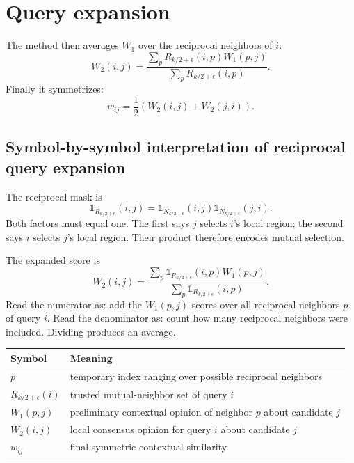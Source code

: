 \documentclass[11pt,oneside,openany]{book}
\theoremstyle{myplain}
\theoremstyle{definition}
\newcommand{\ind}{\mathds{1}}
\newcommand{\paperEq}[1]{\tag{P#1}}
\begin{document}
\section{Query expansion}

The method then averages $W_1$ over the reciprocal neighbors of $i$:
\begin{equation}
  W_2(i,j)=
  \frac{\sum_p R_{k/2+\epsilon}(i,p)W_1(p,j)}
       {\sum_p R_{k/2+\epsilon}(i,p)}.
  \label{eq:w2}
\end{equation}
Finally it symmetrizes:
\begin{equation*}
  \boxed{w_{ij}=\frac12\left(W_2(i,j)+W_2(j,i)\right).}
\paperEq{4}
\label{eq:qe}
\end{equation*}

\subsection{Symbol-by-symbol interpretation of reciprocal query expansion}

The reciprocal mask is
\[
\ind_{R_{k/2+\epsilon}}(i,j)
=
\ind_{N_{k/2+\epsilon}}(i,j)
\ind_{N_{k/2+\epsilon}}(j,i).
\]
Both factors must equal one. The first says $j$ selects $i$'s local region; the second says $i$ selects $j$'s local region. Their product therefore encodes mutual selection.

The expanded score is
\[
W_2(i,j)=
\frac{\sum_p\ind_{R_{k/2+\epsilon}}(i,p)W_1(p,j)}
{\sum_p\ind_{R_{k/2+\epsilon}}(i,p)}.
\]
Read the numerator as: add the $W_1(p,j)$ scores over all reciprocal neighbors $p$ of query $i$. Read the denominator as: count how many reciprocal neighbors were included. Dividing produces an average.

\begin{center}
\begin{tabularx}{\textwidth}{>{\bfseries}l X}
\toprule
Symbol & Meaning \\
\midrule
$p$ & temporary index ranging over possible reciprocal neighbors \\
$R_{k/2+\epsilon}(i)$ & trusted mutual-neighbor set of query $i$ \\
$W_1(p,j)$ & preliminary contextual opinion of neighbor $p$ about candidate $j$ \\
$W_2(i,j)$ & local consensus opinion for query $i$ about candidate $j$ \\
$w_{ij}$ & final symmetric contextual similarity \\
\bottomrule
\end{tabularx}
\end{center}
\end{document}
